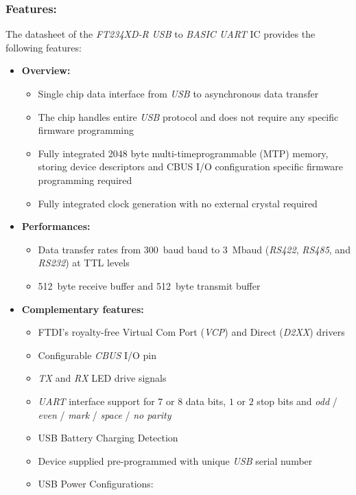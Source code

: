 \documentclass[report.tex]{subfiles}
\begin{document}
\subsubsection{Features:}

The datasheet of the \textit{FT234XD-R}\cite{FTDIUSB} \textit{USB} to \textit{BASIC UART} IC provides the following features:

\begin{itemize}
\item \textbf{Overview:}
\begin{itemize}
\item Single chip data interface from \textit{USB} to asynchronous data transfer
\item The chip handles entire \textit{USB} protocol and does not require any specific firmware programming
\item Fully integrated 2048 byte multi-timeprogrammable (MTP) memory, storing device descriptors and CBUS I/O configuration specific firmware programming required
\item Fully integrated clock generation with no external crystal required
\end{itemize}
\item \textbf{Performances:}
\begin{itemize}
\item Data transfer rates from \SI{300}{baud} baud to \SI{3}{\mega baud} (\textit{RS422}, \textit{RS485}, and \textit{RS232}) at TTL levels
\item \SI{512}{byte} receive buffer and \SI{512}{byte} transmit buffer
\end{itemize}
\item \textbf{Complementary features:}
\begin{itemize}
\item FTDI’s royalty-free Virtual Com Port (\textit{VCP}) and Direct (\textit{D2XX}) drivers
\item Configurable \textit{CBUS} I/O pin
\item \textit{TX} and \textit{RX} LED drive signals
\item \textit{UART} interface support for $7$ or $8$ data bits, $1$ or $2$ stop bits and \textit{odd} / \textit{even} / \textit{mark} / \textit{space} / \textit{no parity}
\item USB Battery Charging Detection
\item Device supplied pre-programmed with unique \textit{USB} serial number
\item USB Power Configurations:
\begin{itemize}

\end{itemize}
\end{itemize}
\end{itemize}
\end{document}
